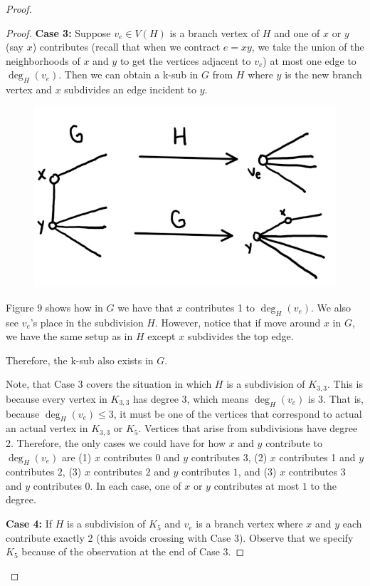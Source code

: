 \documentclass[12pt]{article}
\theoremstyle{definition}
\begin{document}
\begin{proof}
\begin{proof}
        \textbf{Case 3:} Suppose $v_e \in V(H)$ is a branch vertex of $H$ and one of $x$ or $y$ (say $x$) contributes (recall that when we contract $e = xy$, we take the union of the neighborhoods of $x$ and $y$ to get the vertices adjacent to $v_e$) at most one edge to $\deg_H(v_e)$. Then we can obtain a k-sub in $G$ from $H$ where $y$ is the new branch vertex and $x$ subdivides an edge incident to $y$.
        \begin{figure}[hbt!]
            \centering
            \includegraphics[width=0.5\linewidth]{graphs/contribute_contraction.png}
            \caption{}
        \end{figure}

        Figure $9$ shows how in $G$ we have that $x$ contributes 1 to $\deg_H(v_e)$. We also see $v_e$'s place in the subdivision $H$. However, notice that if move around $x$ in $G$, we have the same setup as in $H$ except $x$ subdivides the top edge.

        Therefore, the k-sub also exists in $G$.

        Note, that Case 3 covers the situation in which $H$ is a subdivision of $K_{3,3}$. This is because every vertex in $K_{3,3}$ has degree 3, which means $\deg_H(v_e)$ is 3. That is, because $\deg_H(v_e) \leq 3$, it must be one of the vertices that correspond to actual an actual vertex in $K_{3,3}$ or $K_5$. Vertices that arise from subdivisions have degree 2. Therefore, the only cases we could have for how $x$ and $y$ contribute to $\deg_H(v_e)$ are (1) $x$ contributes 0 and $y$ contributes 3, (2) $x$ contributes 1 and $y$ contributes $2$, (3) $x$ contributes $2$ and $y$ contributes $1$, and (3) $x$ contributes 3 and $y$ contributes 0. In each case, one of $x$ or $y$ contributes at most $1$ to the degree.

        \textbf{Case 4:} If $H$ is a subdivision of $K_5$ and $v_e$ is a branch vertex where $x$ and $y$ each contribute exactly 2 (this avoids crossing with Case 3). Observe that we specify $K_5$ because of the observation at the end of Case 3.


\end{proof}
\end{proof}
\end{document}

